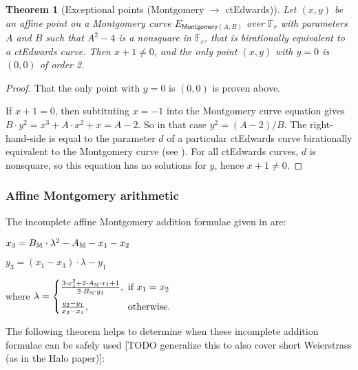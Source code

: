 \documentclass{article}
\newtheorem{theorem}{Theorem}[subsection]
\newcommand{\Field}[1]{\mathbb{F}_{\!#1}}
\newcommand{\squash}{\!\!\!}
\newcommand{\caseif}{\squash\text{if }}
\newcommand{\caseotherwise}{\squash\text{otherwise}}
\newcommand{\mult}{\cdot}
\newcommand{\ParamM}[1]{{{#1}_\mathbb{\hskip 0.03em M}}}
\newcommand{\Montgomery}[1]{E_{\mathsf{Montgomery}({#1})}}
\begin{document}
\begin{theorem}[Exceptional points (Montgomery $\rightarrow$ ctEdwards)]

Let $(x, y)$ be an affine point on a Montgomery curve $\Montgomery{A,B}$ over $\Field{r}$
with parameters $A$ and $B$ such that $A^2 - 4$ is a nonsquare in $\Field{r}$,
that is birationally equivalent to a ctEdwards curve.
Then $x + 1 \neq 0$, and the only point $(x, y)$ with $y = 0$ is
$(0, 0)$ of order 2.
\end{theorem}

\begin{proof}
That the only point with $y = 0$ is $(0, 0)$ is proven above.

If $x + 1 = 0$, then subtituting $x = -1$ into the Montgomery curve equation gives
$B \mult y^2 = x^3 + A \mult x^2 + x = A - 2$.
So in that case $y^2 = (A - 2)/B$. The right-hand-side is equal
to the parameter $d$ of a particular ctEdwards curve birationally
equivalent to the Montgomery curve (see \cite[section 4.3.5]{BL2017}).
For all ctEdwards curves, $d$ is nonsquare, so this equation
has no solutions for $y$, hence $x + 1 \neq 0$.
\end{proof}


\subsubsection{Affine Montgomery arithmetic} \label{cctmontarithmetic}

The incomplete affine Montgomery addition formulae given in
\cite[section 4.3.2]{BL2017} are:

\begin{formulae}
  \item $x_3 = \ParamM{B} \mult \lambda^2 - \ParamM{A} - x_1 - x_2$
  \item $y_3 = (x_1 - x_3) \mult \lambda - y_1$
  \item where $\lambda = \begin{cases}
          \frac{3 \mult x_1^2 + 2 \mult \ParamM{A} \mult x_1 + 1}{2 \mult \ParamM{B} \mult y_1},
                                        &\caseif x_1 = x_2 \\[1.4ex]
          \frac{y_2 - y_1}{x_2 - x_1}, &\caseotherwise.
        \end{cases}$
\end{formulae}

The following theorem helps to determine when these incomplete addition formulae
can be safely used
[TODO generalize this to also cover short Weierstrass (as in the Halo paper)]:
\end{document}
